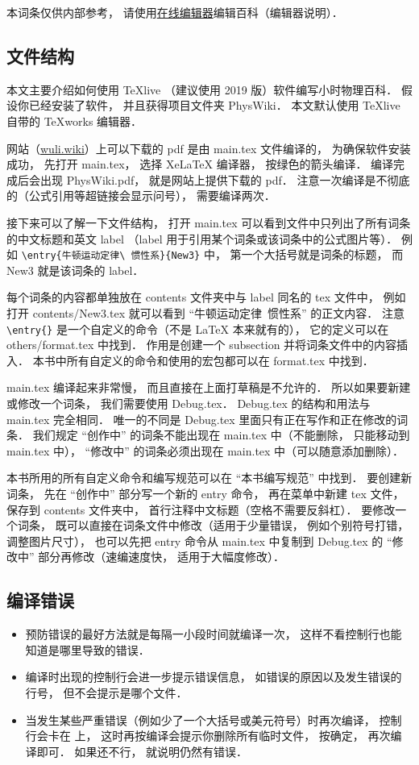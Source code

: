 
本词条仅供内部参考， 请使用\href{http://wuli.wiki/editor}{在线编辑器}编辑百科（编辑器说明）．

\subsection{文件结构}

本文主要介绍如何使用 TeXlive （建议使用 2019 版）软件编写小时物理百科． 假设你已经安装了软件， 并且获得项目文件夹 PhysWiki． 本文默认使用 TeXlive 自带的 TeXworks 编辑器．

网站（\href{http://wuli.wiki}{wuli.wiki}）上可以下载的 pdf 是由 main.tex 文件编译的， 为确保软件安装成功， 先打开 main.tex， 选择 XeLaTeX 编译器， 按绿色的箭头编译． 编译完成后会出现 PhysWiki.pdf， 就是网站上提供下载的 pdf． 注意一次编译是不彻底的（公式引用等超链接会显示问号）， 需要编译两次．

接下来可以了解一下文件结构， 打开 main.tex 可以看到文件中只列出了所有词条的中文标题和英文 label （label 用于引用某个词条或该词条中的公式图片等）． 例如 \lstinline|\entry{牛顿运动定律\ 惯性系}{New3}| 中， 第一个大括号就是词条的标题， 而 New3 就是该词条的 label．

每个词条的内容都单独放在 contents 文件夹中与 label 同名的 tex 文件中， 例如打开 contents/New3.tex 就可以看到 “牛顿运动定律\ 惯性系” 的正文内容． 注意 \lstinline|\entry{}| 是一个自定义的命令（不是 LaTeX 本来就有的）， 它的定义可以在 others/format.tex 中找到． 作用是创建一个 subsection 并将词条文件中的内容插入． 本书中所有自定义的命令和使用的宏包都可以在 format.tex 中找到．

main.tex 编译起来非常慢， 而且直接在上面打草稿是不允许的． 所以如果要新建或修改一个词条， 我们需要使用 Debug.tex． Debug.tex 的结构和用法与 main.tex 完全相同． 唯一的不同是 Debug.tex 里面只有正在写作和正在修改的词条． 我们规定 “创作中” 的词条不能出现在 main.tex 中（不能删除， 只能移动到 main.tex 中）， “修改中” 的词条必须出现在 main.tex 中（可以随意添加删除）．

本书所用的所有自定义命令和编写规范可以在 “本书编写规范” 中找到． 要创建新词条， 先在 “创作中” 部分写一个新的 entry 命令， 再在菜单中新建 tex 文件， 保存到 contents 文件夹中， 首行注释中文标题（空格不需要反斜杠）． 要修改一个词条， 既可以直接在词条文件中修改（适用于少量错误， 例如个别符号打错， 调整图片尺寸）， 也可以先把 entry 命令从 main.tex 中复制到 Debug.tex 的 “修改中” 部分再修改（速编速度快， 适用于大幅度修改）．

\subsection{编译错误}

\begin{itemize}
\item 预防错误的最好方法就是每隔一小段时间就编译一次， 这样不看控制行也能知道是哪里导致的错误．
\item 编译时出现的控制行会进一步提示错误信息， 如错误的原因以及发生错误的行号， 但不会提示是哪个文件．
\item 当发生某些严重错误（例如少了一个大括号或美元符号）时再次编译， 控制行会卡在 \lstinline|| 上， 这时再按编译会提示你删除所有临时文件， 按确定， 再次编译即可． 如果还不行， 就说明仍然有错误．
\end{itemize}
